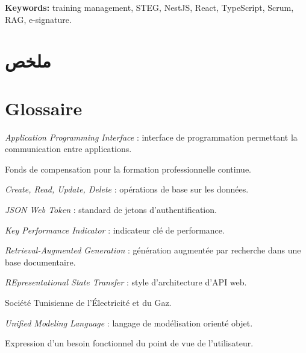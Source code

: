 \documentclass[12pt,a4paper]{report}
\begin{document}
\textbf{Keywords:} training management, STEG, NestJS, React, TypeScript,
Scrum, RAG, e-signature.

\chapter*{ملخص}
\begin{center}
\end{center}

\tableofcontents
\listoffigures
\listoftables

\chapter*{Glossaire}
\begin{description}[style=nextline]
  \item[API] \emph{Application Programming Interface} : interface de
    programmation permettant la communication entre applications.
  \item[CNFCPP] Fonds de compensation pour la formation professionnelle continue.
  \item[CRUD] \emph{Create, Read, Update, Delete} : opérations de base sur les données.
  \item[JWT] \emph{JSON Web Token} : standard de jetons d'authentification.
  \item[KPI] \emph{Key Performance Indicator} : indicateur clé de performance.
  \item[RAG] \emph{Retrieval-Augmented Generation} : génération augmentée par
    recherche dans une base documentaire.
  \item[REST] \emph{REpresentational State Transfer} : style d'architecture d'API web.
  \item[STEG] Société Tunisienne de l'Électricité et du Gaz.
  \item[UML] \emph{Unified Modeling Language} : langage de modélisation orienté objet.
  \item[User Story] Expression d'un besoin fonctionnel du point de vue de l'utilisateur.
\end{description}
\end{document}
